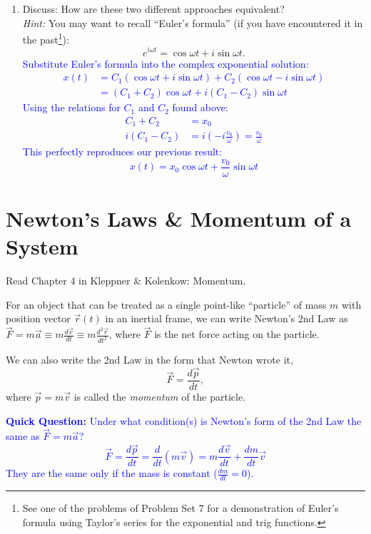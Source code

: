 \documentclass[11pt, letterpaper, openany]{book}
\newenvironment{exercise}[1][Exercise]{%
  \tcolorbox[blanker, breakable, left=1em,
    before skip=1em, after skip=1em,
    borderline west={3pt}{0pt}{PhysNavy},
    colback=PhysCream,
    before upper={\textcolor{PhysNavy}{\sffamily\bfseries #1:}\space}
  ]%
}{%
  \endtcolorbox%
}
\begin{document}
\begin{exercise}[Exercise 4]
\begin{enumerate}[label=(\alph*)]
    \item Discuss: How are these two different approaches equivalent? \\
    \textit{Hint:} You may want to recall ``Euler's formula'' (if you have encountered it in the past\footnote{See one of the problems of Problem Set 7 for a demonstration of Euler's formula using Taylor's series for the exponential and trig functions.}):
    \[ e^{i\omega t} = \cos\omega t + i\sin\omega t. \]
    \textcolor{blue}{
    Substitute Euler's formula into the complex exponential solution:
    \begin{align*}
        x(t) &= C_1(\cos\omega t + i\sin\omega t) + C_2(\cos\omega t - i\sin\omega t) \\
             &= (C_1 + C_2)\cos\omega t + i(C_1 - C_2)\sin\omega t
    \end{align*}
    Using the relations for $C_1$ and $C_2$ found above:
    \begin{align*}
        C_1 + C_2 &= x_0 \\
        i(C_1 - C_2) &= i\left( -i\frac{v_0}{\omega} \right) = \frac{v_0}{\omega}
    \end{align*}
    This perfectly reproduces our previous result:
    \[ x(t) = x_0\cos\omega t + \frac{v_0}{\omega}\sin\omega t \]
    }
\end{enumerate}
\end{exercise}

\chapter{Newton's Laws \& Momentum of a System}

Read Chapter 4 in Kleppner \& Kolenkow: Momentum.

For an object that can be treated as a single point-like ``particle'' of mass $m$ with position vector $\vec{r}(t)$ in an inertial frame, we can write Newton's 2nd Law as $\vec{F} = m\vec{a} \equiv m\frac{d\vec{v}}{dt} \equiv m\frac{d^2\vec{r}}{dt^2}$, where $\vec{F}$ is the net force acting on the particle.

We can also write the 2nd Law in the form that Newton wrote it,
\[ \vec{F} = \frac{d\vec{p}}{dt}, \tag{1} \]
where $\vec{p} = m\vec{v}$ is called the \textit{momentum} of the particle.

\textcolor{blue}{\textbf{Quick Question:} Under what condition(s) is Newton's form of the 2nd Law the same as $\vec{F} = m\vec{a}$?} \\
\textcolor{blue}{
\[ \vec{F} = \frac{d\vec{p}}{dt} = \frac{d}{dt}(m\vec{v}) = m\frac{d\vec{v}}{dt} + \frac{dm}{dt}\vec{v} \]
They are the same only if the mass is constant ($\frac{dm}{dt} = 0$).
}
\end{document}

